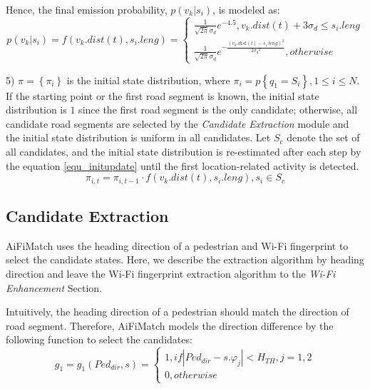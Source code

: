 \documentclass{llncs}
\begin{document}
Hence, the final emission probability, $p(v_k|s_i)$, is modeled as:
\begin{equation}
p(v_k|s_i)=f({v_k}.dist(t),{s_i}.leng) = \left\{ {\begin{array}{*{20}{l}}
	{\frac{1}{{\sqrt {2\pi } {\sigma _d}}}{e^{-4.5}},{v_k}.dist(t) + 3{\sigma _d} \le {s_i}.leng}\\
	{\frac{1}{{\sqrt {2\pi } {\sigma _d}}}{e^{ - \frac{{{{({v_k}.dist(t) - {s_i}.leng)}^2}}}{{2{\sigma _d}^2}}}},otherwise}
	\end{array}} \right.
\end{equation}

5) $\pi  = \left\{ {{\pi _i}} \right\}$ is the initial state distribution, where ${\pi _i} = p\left\{ {{q_1} = {S_i}} \right\},1 \le i \le N$. If the starting point or the first road segment is known, the initial state distribution is $1$ since the first road segment is the only candidate; otherwise, all candidate road segments are selected by the \emph{Candidate Extraction} module and the initial state distribution is uniform in all candidates. Let $S_c$ denote the set of all candidates, and the initial state distribution is re-estimated after each step by the equation \ref{equ_initupdate} until the first location-related activity is detected.
\begin{equation}
\label{equ_initupdate}
{\pi _{i,t}} = {\pi _{i,t - 1}} \cdot f({v_k}.dist(t),{s_i}.leng),{s_i} \in {S_c}
\end{equation}

\subsection{Candidate Extraction}

AiFiMatch uses the heading direction of a pedestrian and Wi-Fi fingerprint to select the candidate states. Here, we describe the extraction algorithm by heading direction and leave the Wi-Fi fingerprint extraction algorithm to the \emph{Wi-Fi Enhancement} Section.
	 
Intuitively, the heading direction of a pedestrian should match the direction of road segment. Therefore, AiFiMatch models the direction difference by the following function to select the candidates:
\begin{equation}
{g_1} = {g_1}({Ped_{dir}},s) = \left\{ {\begin{array}{*{20}{l}}
	{1,if\left| {{Ped_{dir}} - s.{{\varphi}_j}} \right| < H_{TH},j = 1,2}\\
	{0,otherwise}
	\end{array}} \right.
\end{equation}
\end{document}
